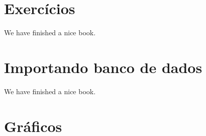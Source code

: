 \documentclass[
]{book}
\begin{document}
\hypertarget{exercuxedcios}{%
\chapter{Exercícios}\label{exercuxedcios}}

We have finished a nice book.

\hypertarget{importando-banco-de-dados}{%
\chapter{Importando banco de dados}\label{importando-banco-de-dados}}

We have finished a nice book.

\hypertarget{gruxe1ficos}{%
\chapter{Gráficos}\label{gruxe1ficos}}

  
\end{document}

